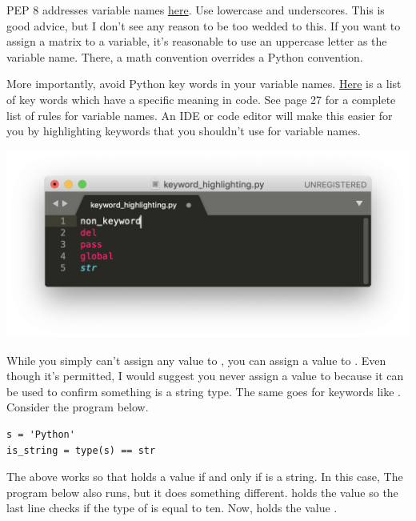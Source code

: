 \smallskip

PEP 8 addresses variable names \textcolor{blue}{\href{https://www.python.org/dev/peps/pep-0008/\#function-and-variable-names}{here}}.
Use lowercase and underscores. This is good advice, but I don't see any reason to be too wedded to this. If you want to assign a matrix to a variable, 
it's reasonable to use an uppercase letter as the variable name. There, a math convention overrides a Python convention. %

\smallskip

More importantly, avoid Python key words in your variable names. \textcolor{blue}{\href{https://www.w3schools.com/python/python_ref_keywords.asp}
{Here}} is a list of key words which have a specific meaning in code. See \cite{lubanovic2019introducing} page 27 for a complete list of rules for variable names. An IDE or code editor will make this easier for you by highlighting keywords that you shouldn't use for variable names. 

\begin{center}
\includegraphics[width = .53\textwidth]{images/sublime_keyword_highlight.png}
\end{center}

While you simply can't assign any value to , you can assign a value to . Even though it's permitted, I would suggest you never assign a value to  because it can be used to confirm something is a string type. The same goes for keywords like . Consider the program below. 

\begin{lstlisting}
s = 'Python'
is_string = type(s) == str
\end{lstlisting}

The above works so that  holds a value  if and only if  is a string. In this case,  The program below also runs, but it does something different.  holds the value  so the last line checks if the type of  is equal to ten. Now,  holds the value .

